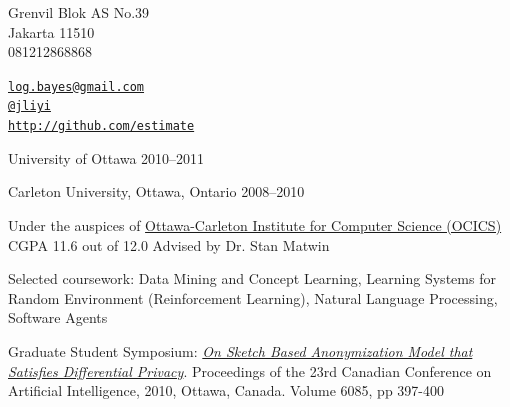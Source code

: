 \documentclass[11pt,article,oneside]{memoir}
\makeatletter
\def\myemail{log.bayes@gmail.com}
\def\myweb{http://github.com/estimate}
\def\myphone{081212868868}
\def\mytwitter{@jliyi}
\makeatother
\begin{document}
\reversemarginpar

\hfill\hfill\hfill
{
\begin{minipage}[b]{1.2in}
    \flushleft \footnotesize \addressblock
    Grenvil Blok AS No.39 \\ 
    Jakarta 11510 \\
    \myphone \, \faMobilePhone
\end{minipage}
\hfill
\begin{minipage}[b]{1.8in}
    	\flushright \footnotesize 
   	{\scriptsize \texttt{\href{mailto:\myemail}{\myemail}} \, \faEnvelope} \\
	{\scriptsize  \texttt{\href{http://twitter.com/jliyi}{\mytwitter}} \, \faTwitter } \\ 
    	{\scriptsize \texttt{\href{\myweb}{\myweb}} \, \faGithub}
\end{minipage}
}\par

\bigskip

\bigskip       



\ind University of Ottawa \hfill 2010--2011

\ind Carleton University, Ottawa, Ontario \hfill 2008--2010

\ind \hspace{0.35in} \footnotesize Under the auspices of \href{https://ocics.site.uottawa.ca/}{Ottawa-Carleton Institute for Computer Science (OCICS)} \newline CGPA 11.6 out of 12.0 
\newline Advised by Dr. Stan Matwin
\normalsize \vspace{0.07in}

\ind \hspace{0.35in} \footnotesize Selected coursework: Data Mining and Concept Learning, Learning Systems for Random Environment (Reinforcement Learning), Natural Language Processing, Software Agents
\normalsize \vspace{0.07in}

\ind \hspace{0.35in} \footnotesize Graduate Student Symposium: \emph{\href{http://link.springer.com/chapter/10.1007/978-3-642-13059-5_55}{On Sketch Based Anonymization Model that Satisfies Differential Privacy}}. Proceedings of the 23rd Canadian Conference on Artificial Intelligence, 2010, Ottawa, Canada. Volume 6085, pp 397-400
\end{document}
